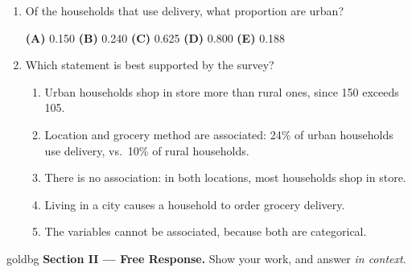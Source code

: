 \documentclass[12pt]{article}
\begin{document}
\begin{enumerate}[leftmargin=1.9em, itemsep=0.08in]

  \item Of the households that use delivery, what proportion are urban?
        \hfill{}\rule[-0.2in]{0pt}{0.48in}
        \par\vspace{3pt}
        \hspace*{1.2em}\textbf{(A)} 0.150 \hfill \textbf{(B)} 0.240 \hfill \textbf{(C)} 0.625
        \hfill \textbf{(D)} 0.800 \hfill \textbf{(E)} 0.188 \hspace*{1.2em}

  \item Which statement is best supported by the survey?
        \begin{enumerate}[label=\textbf{(\Alph*)}, leftmargin=2.2em, itemsep=0pt]
          \item Urban households shop in store more than rural ones, since 150 exceeds 105.
          \item Location and grocery method are associated: 24\% of urban households use
                delivery, vs.\ 10\% of rural households.
          \item There is no association: in both locations, most households shop in store.
          \item Living in a city causes a household to order grocery delivery.
          \item The variables cannot be associated, because both are categorical.
                \hfill{}\rule[-0.2in]{0pt}{0.48in}
        \end{enumerate}

\end{enumerate}

\vspace{0.06in}

\boxguard[22]
\begin{headlinebox}{goldbg}
\small
\textbf{Section II --- Free Response.} Show your work, and answer \emph{in context}.
\end{headlinebox}

\vspace{0.04in}
\end{document}
